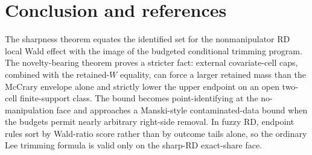 \documentclass[11pt]{article}
\theoremstyle{definition}
\theoremstyle{plain}
\theoremstyle{remark}
\begin{document}
\section{Conclusion and references}
The sharpness theorem equates the identified set for the nonmanipulator RD local Wald
effect with the image of the budgeted conditional trimming program.  The novelty-bearing
theorem proves a stricter fact: external covariate-cell caps, combined with the
retained-\(W\) equality, can force a larger retained mass than the McCrary envelope alone
and strictly lower the upper endpoint on an open two-cell finite-support class.  The bound
becomes point-identifying at the no-manipulation face and approaches a Manski-style
contaminated-data bound when the budgets permit nearly arbitrary right-side removal.  In
fuzzy RD, endpoint rules sort by Wald-ratio score rather than by outcome tails alone, so
the ordinary Lee trimming formula is valid only on the sharp-RD exact-share face.
\end{document}
